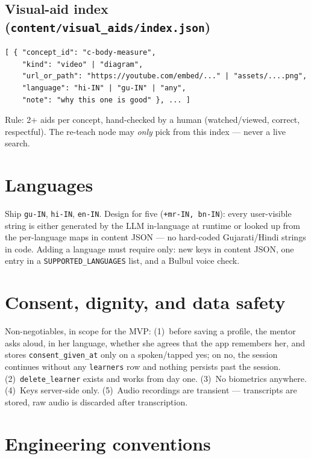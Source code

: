 \documentclass[11pt]{article}
\newcommand{\code}[1]{\texttt{#1}}
\begin{document}
\subsection{Visual-aid index (\code{content/visual\_aids/index.json})}

\begin{verbatim}
[ { "concept_id": "c-body-measure",
    "kind": "video" | "diagram",
    "url_or_path": "https://youtube.com/embed/..." | "assets/....png",
    "language": "hi-IN" | "gu-IN" | "any",
    "note": "why this one is good" }, ... ]
\end{verbatim}

Rule: 2+ aids per concept, hand-checked by a human (watched/viewed, correct, respectful). The re-teach node may \emph{only} pick from this index --- never a live search.

\section{Languages}

Ship \code{gu-IN}, \code{hi-IN}, \code{en-IN}. Design for five (\code{+mr-IN, bn-IN}): every user-visible string is either generated by the LLM in-language at runtime or looked up from the per-language maps in content JSON --- no hard-coded Gujarati/Hindi strings in code. Adding a language must require only: new keys in content JSON, one entry in a \code{SUPPORTED\_LANGUAGES} list, and a Bulbul voice check.

\section{Consent, dignity, and data safety}
\label{sec:consent}

Non-negotiables, in scope for the MVP: (1)~before saving a profile, the mentor asks aloud, in her language, whether she agrees that the app remembers her, and stores \code{consent\_given\_at} only on a spoken/tapped yes; on no, the session continues without any \code{learners} row and nothing persists past the session. (2)~\code{delete\_learner} exists and works from day one. (3)~No biometrics anywhere. (4)~Keys server-side only. (5)~Audio recordings are transient --- transcripts are stored, raw audio is discarded after transcription.

\section{Engineering conventions}
\end{document}
